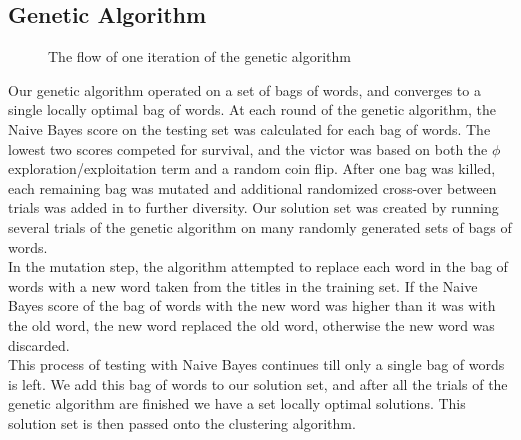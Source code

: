 \documentclass{sig-alternate}
\begin{document}
\subsection{Genetic Algorithm}
\begin{figure}[t]
\centering
{}
\caption{The flow of one iteration of the genetic algorithm}
\label{fig:genetic_algo}
\end{figure}
Our genetic algorithm operated on a set of bags of words, and converges to a single locally optimal bag of words. At each round of the genetic algorithm, the Naive Bayes score on the testing set was calculated for each bag of words. The lowest two scores competed for survival, and the victor was based on both the $\phi$ exploration/exploitation term and a random coin flip. After one bag was killed, each remaining bag was mutated and additional randomized cross-over between trials was added in to further diversity. Our solution set was created by running several trials of the genetic algorithm on many randomly generated sets of bags of words.\\
\indent In the mutation step, the algorithm attempted to replace each word in the bag of words with a new word taken from the titles in the training set. If the Naive Bayes score of the bag of words with the new word was higher than it was with the old word, the new word replaced the old word, otherwise the new word was discarded.\\
\indent This process of testing with Naive Bayes continues till only a single bag of words is left. We add this bag of words to our solution set, and after all the trials of the genetic algorithm are finished we have a set locally optimal solutions. This solution set is then passed onto the clustering algorithm.
\end{document}
